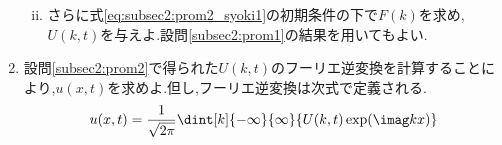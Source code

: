 \documentclass[dvipdfmx,titlepage, 11pt, a4paper]{jsarticle}%
\begin{document}
\begin{enumerate}[(1)]
\begin{enumerate}[(i)]
\begin{equation*}
        \end{equation*}
        \item さらに式\eqref{eq:subsec2:prom2_syoki1}の初期条件の下で$F(k)$を求め,$U(k, t)$を与えよ.設問\eqref{subsec2:prom1}の結果を用いてもよい.\label{subsec2:prom2:prom3}
    \end{enumerate}
    \item 設問\ref{subsec2:prom2}で得られた$U(k, t)$のフーリエ逆変換を計算することにより,$u(x, t)$を求めよ.但し,フーリエ逆変換は次式で定義される.\label{subsec2:prom3}
    \begin{equation*}
        u(x, t) = \frac{1}{\sqrt{2\pi}}\dint[k]{-\infty}{\infty}{U(k, t)\exp(\imag kx)}
    \end{equation*}
\end{enumerate}

\newpage
\end{document}
